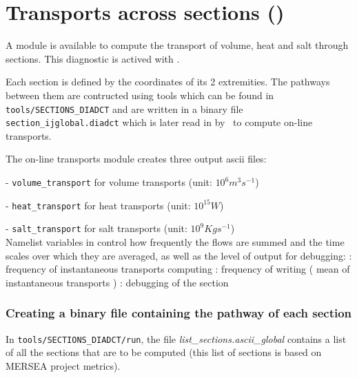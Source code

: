 \documentclass[../main/NEMO_manual]{subfiles}
\begin{document}
\section[Transports across sections (\texttt{\textbf{key\_diadct}})]{Transports across sections (\protect{})}
\label{sec:DIA_diag_dct}

\begin{listing}
  \caption{}
  \label{lst:nam_diadct}
\end{listing}

A module is available to compute the transport of volume, heat and salt through sections.
This diagnostic is actived with .

Each section is defined by the coordinates of its 2 extremities.
The pathways between them are contructed using tools which can be found in \texttt{tools/SECTIONS\_DIADCT}
and are written in a binary file \texttt{section\_ijglobal.diadct} which is later read in by
\NEMO\ to compute on-line transports.

The on-line transports module creates three output ascii files:

- \texttt{volume\_transport} for volume transports (unit: $10^{6} m^{3} s^{-1}$)

- \texttt{heat\_transport}   for   heat transports (unit: $10^{15} W$)

- \texttt{salt\_transport}   for   salt transports (unit: $10^{9}Kg s^{-1}$) \\

Namelist variables in  control how frequently the flows are summed and the time scales over which
they are averaged, as well as the level of output for debugging:
   : frequency of instantaneous transports computing
: frequency of writing ( mean of instantaneous transports )
 : debugging of the section

\subsubsection{Creating a binary file containing the pathway of each section}

In \texttt{tools/SECTIONS\_DIADCT/run},
the file \textit{ {list\_sections.ascii\_global}} contains a list of all the sections that are to be computed
(this list of sections is based on MERSEA project metrics).
\end{document}
